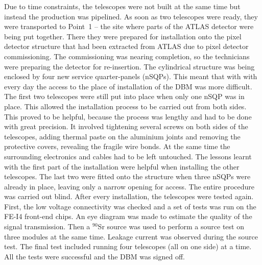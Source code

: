 Due to time constraints, the telescopes were not built at the same time but instead the production was pipelined. As soon as two telescopes were ready, they were transported to Point~1 -- the site where parts of the ATLAS detector were being put together. There they were prepared for installation onto the pixel detector structure that had been extracted from ATLAS due to pixel detector commissioning. The commissioning was nearing completion, so the technicians were preparing the detector for re-insertion. The cylindrical structure was being enclosed by four new service quarter-panels (nSQPs). This meant that with with every day the access to the place of installation of the DBM was more difficult. The first two telescopes were still put into place when only one nSQP was in place. This allowed the installation process to be carried out from both sides. This proved to be helpful, because the process was lengthy and had to be done with great precision. It involved tightening several screws on both sides of the telescopes, adding thermal paste on the aluminium joints and removing the protective covers, revealing the fragile wire bonds. At the same time the surrounding electronics and cables had to be left untouched. The lessons learnt with the first part of the installation were helpful when installing the other telescopes. The last two were fitted onto the structure when three nSQPs were already in place, leaving only a narrow opening for access. The entire procedure was carried out blind. After every installation, the telescopes were tested again. First, the low voltage connectivity was checked and a set of tests was run on the FE-I4 front-end chips. An eye diagram was made to estimate the quality of the signal transmission. Then a $^{90}$Sr source was used to perform a source test on three modules at the same time. Leakage current was observed during the source test. The final test included running four telescopes (all on one side) at a time. All the tests were successful and the DBM was signed off.

